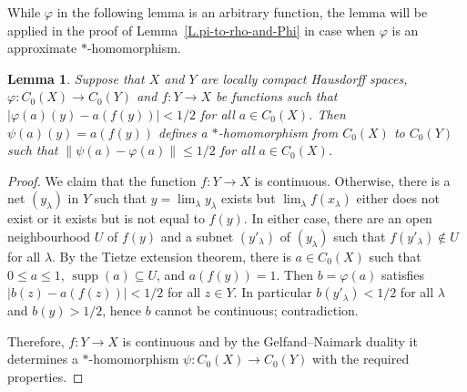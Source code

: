 \documentclass[11pt]{amsproc}
\DeclareMathOperator{\Eval}{Eval}
\DeclareMathOperator{\supp}{supp}
\theoremstyle{definition}
\theoremstyle{plain}
\newtheorem{lemma}[definition]{Lemma}
\theoremstyle{remark}
\begin{document}
While $\varphi$ in the following lemma  is an arbitrary function, the lemma will be applied in the proof of Lemma~\ref{L.pi-to-rho-and-Phi} in case when $\varphi$ is an approximate $*$-homomorphism. 

\begin{lemma}\label{L.FunctionfIsContinuous}
	Suppose that $X$ and $Y$ are locally compact Hausdorff spaces,  $\varphi\colon C_0(X)\to C_0(Y)$ and $f\colon Y\to X$ be functions such that $|\varphi(a)(y)-a(f(y))|<1/2$ for all $a\in C_0(X)$.  Then $\psi(a)(y)=a(f(y))$ defines a $*$-homomorphism from $C_0(X)$ to $C_0(Y)$ such that $\|\psi(a)-\varphi(a)\|\leq 1/2$ for all $a\in C_0(X)$. 
\end{lemma}

\begin{proof}
	We claim that the function $f\colon Y\to X$ is continuous. 
	Otherwise,  there is a net $(y_\lambda)$ in $Y$ such that $y=\lim_\lambda y_\lambda$ exists but $\lim_\lambda f(x_\lambda)$ either does not exist or it exists but is not equal to $f(y)$. In either case, there are an open neighbourhood $U$ of $f(y)$ and a subnet $(y'_{\lambda})$ of $(y_\lambda)$ such that $f(y'_{\lambda})\notin U$ for all $\lambda$. By the Tietze extension theorem, there is $a\in C_0(X)$ such that $0\leq a\leq 1$, $\supp(a)\subseteq U$, and $a(f(y))=1$.  Then $b=\varphi(a)$ satisfies  $|b(z) -a(f(z))|<1/2$ for all $z\in Y$. In particular $b(y'_{\lambda})<1/2$ for all $\lambda$ and $b(y)>1/2$, hence $b$ cannot be continuous; contradiction. 
	
	Therefore, $f\colon Y\to X$ is continuous and by the Gelfand--Naimark duality it determines a $*$-homomorphism $\psi\colon C_0(X)\to C_0(Y)$ with the required properties. 
\end{proof}
\end{document}
